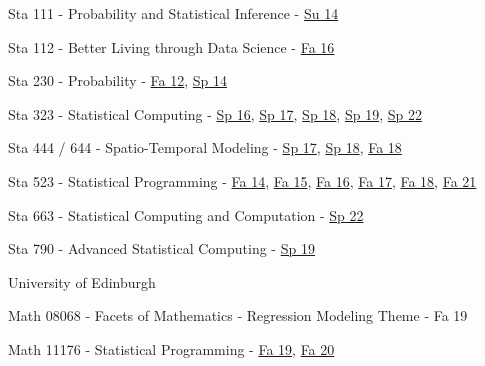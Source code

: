 \documentclass[margin,line]{res}
\begin{document}
\begin{resume}
\begin{list1}
\item[] Sta 111 - Probability and Statistical Inference - \href{https://stat.duke.edu/~cr173/Sta111_Su14/}{Su 14}

\item[] Sta 112 - Better Living through Data Science - \href{http://stat.duke.edu/~cr173/Sta112_Fa16/}{Fa 16}

\item[] Sta 230 - Probability - \href{http://stat.duke.edu/courses/Spring12/sta104.1}{Fa 12}, \href{https://stat.duke.edu/~cr173/Sta230_Sp14/}{Sp 14}

\item[] Sta 323 - Statistical Computing - \href{http://stat.duke.edu/~cr173/Sta323_Sp16/}{Sp 16}, \href{http://stat.duke.edu/~cr173/Sta323_Sp17/}{Sp 17}, \href{http://stat.duke.edu/~cr173/Sta323_Sp18/}{Sp 18}, \href{http://stat.duke.edu/~cr173/Sta323_Sp19/}{Sp 19}, \href{https://sta323-sp22.github.io/}{Sp 22}

\item[] Sta 444 / 644 - Spatio-Temporal Modeling - \href{http://stat.duke.edu/~cr173/Sta444_Sp17/}{Sp 17}, \href{http://stat.duke.edu/~cr173/Sta444_Sp18/}{Sp 18}, \href{http://stat.duke.edu/~cr173/Sta444_Fa18/}{Fa 18}

\item[] Sta 523 - Statistical Programming - \href{https://stat.duke.edu/~cr173/Sta523_Fa14/}{Fa 14}, \href{https://stat.duke.edu/~cr173/Sta523_Fa15/}{Fa 15}, \href{https://stat.duke.edu/~cr173/Sta523_Fa16/}{Fa 16}, \href{https://stat.duke.edu/~cr173/Sta523_Fa17/}{Fa 17}, \href{https://stat.duke.edu/~cr173/Sta523_Fa18/}{Fa 18},
\href{https://sta523-fa21.github.io/}{Fa 21}

\item[] Sta 663 - Statistical Computing and Computation - \href{https://sta663-sp22.github.io/}{Sp 22}


\item[] Sta 790 - Advanced Statistical Computing - \href{http://stat.duke.edu/~cr173/Sta790_Sp16/}{Sp 19}
\end{list1}

University of Edinburgh

\begin{list1}
\item[] Math 08068 - Facets of Mathematics - Regression Modeling Theme - Fa 19 

\item[] Math 11176 - Statistical Programming - \href{https://statprog-s1-2019.github.io/}{Fa 19}, \href{https://statprog-s1-2020.github.io/}{Fa 20}


\end{list1}
\end{resume}
\end{document}
